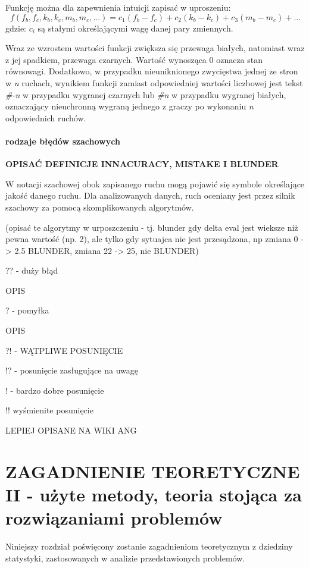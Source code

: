 \documentclass[inzynierska]{pwr_wmat_praca_dyplomowa}
\theoremstyle{plain}
\numberwithin{theorem}{chapter}
\theoremstyle{definition}
\numberwithin{theorem}{chapter}
\begin{document}
Funkcję można dla zapewnienia intuicji zapisać w uproszeniu:
\begin{equation}
	f(f_b,f_c,k_b,k_c,m_b,m_c,\dots)=c_1(f_b-f_c)+c_2(k_b-k_c)+c_3(m_b-m_c)+\dots
\end{equation}
gdzie:
$c_i$ są stałymi określającymi wagę danej pary zmiennych.

Wraz ze wzrostem wartości funkcji zwiększa się przewaga białych, natomiast wraz z jej spadkiem, przewaga czarnych. Wartość wynosząca 0 oznacza stan równowagi. Dodatkowo, w przypadku nieuniknionego zwycięstwa jednej ze stron w \textit{n} ruchach, wynikiem funkcji zamiast odpowiedniej wartości liczbowej jest tekst \textit{\#-n} w przypadku wygranej czarnych lub \textit{\#n} w przypadku wygranej białych, oznaczający nieuchronną wygraną jednego z graczy po wykonaniu \textit{n} odpowiednich ruchów.


\subsubsection{rodzaje błędów szachowych}
\textbf{OPISAĆ DEFINICJE INNACURACY, MISTAKE I BLUNDER}


W notacji szachowej obok zapisanego ruchu mogą pojawić się symbole określające jakość danego ruchu. Dla analizowanych danych, ruch oceniany jest przez silnik szachowy za pomocą skomplikowanych algorytmów.


(opisać te algorytmy w urposzczeniu - tj. blunder gdy delta eval jest wieksze niż pewna wartość (np. 2), ale tylko gdy sytuajca nie jest przesądzona,
np zmiana 0 -> 2.5 BLUNDER, zmiana 22 -> 25, nie BLUNDER)

?? - duży błąd
 
OPIS
 
 
 ? - pomyłka
 
 OPIS
 
 ?! - WĄTPLIWE POSUNIĘCIE
 
 !? - posunięcie zasługujące na uwagę
 
 ! -  bardzo dobre posunięcie
 
 !! wyśmienite posunięcie

LEPIEJ OPISANE NA WIKI ANG 




\chapter{ZAGADNIENIE TEORETYCZNE II - użyte metody, teoria stojąca za rozwiązaniami problemów}
Niniejszy rozdział poświęcony zostanie zagadnieniom teoretycznym z dziedziny statystyki, zastosowanych w analizie przedstawionych problemów.
\end{document}
